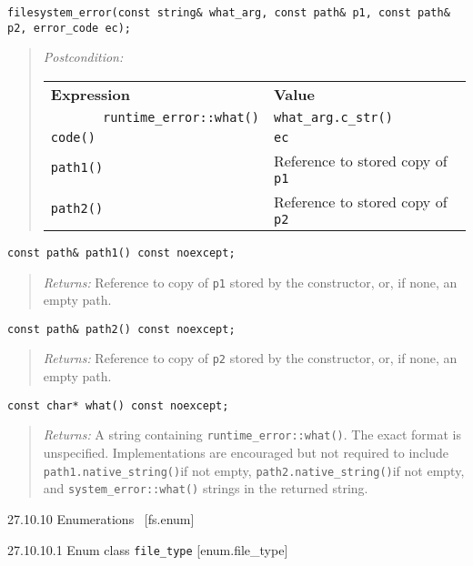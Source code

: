 \begin{verbatim}
filesystem_error(const string& what_arg, const path& p1, const path& p2, error_code ec);
\end{verbatim}

\begin{quote}
\emph{Postcondition:}

\begin{longtable}[c]{@{}ll@{}}
\toprule
\textbf{Expression} & \textbf{Value}\tabularnewline
\texttt{\ \ \ \ \ \ \ runtime\_error::what()} &
\texttt{w}\texttt{hat\_arg.c\_str()}\tabularnewline
\texttt{code()} & \texttt{ec}\tabularnewline
\texttt{path1()} & Reference to stored copy of
\texttt{p1}\tabularnewline
\texttt{path2()} & Reference to stored copy of
\texttt{p2}\tabularnewline
\bottomrule
\end{longtable}
\end{quote}

\begin{verbatim}
const path& path1() const noexcept;
\end{verbatim}

\begin{quote}
\emph{Returns:} Reference to copy of \texttt{p1} stored by the
constructor, or, if none, an empty path.
\end{quote}

\begin{verbatim}
const path& path2() const noexcept;
\end{verbatim}

\begin{quote}
\emph{Returns:} Reference to copy of \texttt{p2} stored by the
constructor, or, if none, an empty path.
\end{quote}

\begin{verbatim}
const char* what() const noexcept;
\end{verbatim}

\begin{quote}
\emph{Returns:} A string containing \texttt{runtime\_error::what()}. The
exact format is unspecified. Implementations are encouraged but not
required to include \texttt{path1.native\_string()}if not empty,
\texttt{path2.native\_string()}if not empty, and
\texttt{system\_error::what()} strings in the returned string.
\end{quote}

27.10.10 Enumerations~ {[}fs.enum{]}

27.10.10.1 Enum class \texttt{file\_type} {[}enum.file\_type{]}

